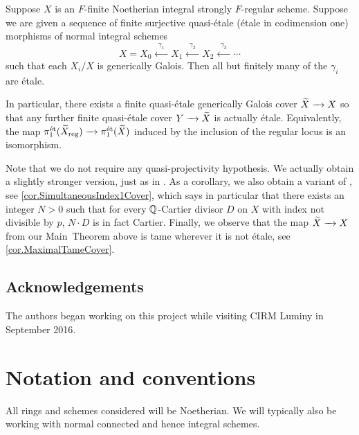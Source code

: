 \documentclass[12pt]{amsart}
\numberwithin{equation}{theorem}
\renewcommand{\:}{\colon}
\newcommand{\piet}{\pi_1^{\textnormal{\'{e}t}}} %
\theoremstyle{theorem}
\begin{document}
\begin{mainthm*}
Suppose $X$ is an $F$-finite Noetherian integral strongly $F$-regular scheme.
Suppose we are given a sequence of finite surjective quasi-\'etale (\'etale in codimension one) morphisms of normal integral schemes
\[ X = X_0 \xleftarrow{\;\;\gamma_1\;\;} X_1 \xleftarrow{\;\;\gamma_2\;\;} X_2 \xleftarrow{\;\;\gamma_3\;\;} \cdots \]
such that each $X_i/X$ is generically Galois.
Then all but finitely many of the $\gamma_i$ are \'etale.

In particular, there exists a finite quasi-\'etale generically Galois cover $\widetilde X \xrightarrow{\ \ } X$ so that any further finite quasi-\'etale cover $Y \xrightarrow{\ \ } \widetilde X$ is actually \'etale.
Equivalently, the map $\piet(\tld X_{\reg}) \to \piet(\tld X)$ induced by the inclusion of the regular locus is an isomorphism.
\end{mainthm*}

Note that we do not require any quasi-projectivity hypothesis.
We actually obtain a slightly stronger version, just as in \cite{GrebKebekusPeternellEtaleFundamental}.
As a corollary, we also obtain a variant of \cite[Theorem 1.10]{GrebKebekusPeternellEtaleFundamental}, see \autoref{cor.SimultaneousIndex1Cover}, which says in particular that there exists an integer $N > 0$ such that for every $\mathbb{Q}$-Cartier divisor $D$ on $X$ with index not divisible by $p$, $N \cdot D$ is in fact Cartier.
Finally, we observe that the map $\widetilde X \xrightarrow{\ \ } X$ from our Main~Theorem above is tame wherever it is not \'etale, see \autoref{cor.MaximalTameCover}.

\subsection*{Acknowledgements}

The authors began working on this project while visiting CIRM Luminy in September 2016.

\section{Notation and conventions}

\begin{convention}
All rings and schemes considered will be Noetherian.  We will typically also be working with normal connected and hence integral schemes.
\end{convention}
\end{document}

